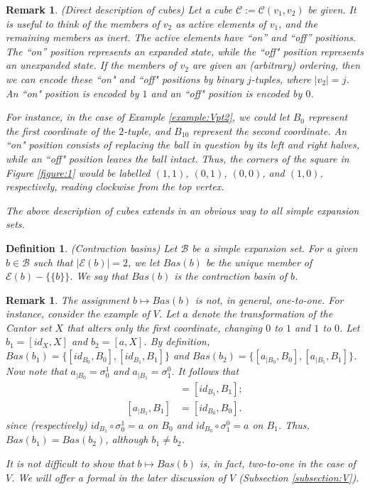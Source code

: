 \documentclass{amsart}
\newtheorem{Definition}[theorem]{Definition}
\newtheorem{Remark}[theorem]{Remark}
\newtheorem{standing assumption}[theorem]{Standing Assumption}
\newenvironment{definition}{\begin{Definition}\normalfont}{\end{Definition}}
\newenvironment{remark}{\begin{Remark}\normalfont}{\end{Remark}}
\begin{document}
\begin{remark} \label{remark:cubes}
(Direct description of cubes)
Let a cube $\mathcal{C} := \mathcal{C}(v_{1}, v_{2})$ be given. It is useful to think of the members of
$v_{2}$ as \emph{active} elements of $v_{1}$, and the remaining members as \emph{inert}. The active elements have ``on'' and ``off'' positions. The ``on'' position represents an expanded state, while the ``off" position represents an unexpanded state.
If the members of $v_{2}$ are given an (arbitrary) ordering, then we can encode these ``on" and ``off" positions by binary $j$-tuples, where $|v_{2}|=j$. An ``on" position is encoded by $1$ and an ``off" position is encoded by $0$. 

For instance, in the case of Example \ref{example:Vpt2}, we could let $B_{0}$ represent the first coordinate of the $2$-tuple, and $B_{10}$ represent the second coordinate. An ``on" position 
consists of replacing the ball in question by its left and right halves, while an ``off" position leaves the ball intact. Thus, the corners of the square in Figure \ref{figure:1} would be labelled  $(1,1)$, $(0,1)$, $(0,0)$, and $(1,0)$, respectively, reading clockwise from the top vertex. 

The above description of cubes extends in an obvious way to all simple expansion sets. 
\end{remark}

\begin{definition} \label{definition:basin} (Contraction basins)
Let $\mathcal{B}$ be a simple expansion set. For a given $b \in \mathcal{B}$ such that
$|\mathcal{E}(b)|=2$, we let $Bas(b)$ be the unique member of 
$\mathcal{E}(b) - \{ \{b \} \}$. We say that $Bas(b)$ is the \emph{contraction basin of $b$}.
\end{definition}

\begin{remark}
The assignment $b \mapsto Bas(b)$ is not, in general, one-to-one. For instance, consider the example of $V$. Let $a$ denote the transformation of the Cantor set $X$ that alters only the first coordinate, changing $0$ to $1$ and $1$ to $0$. Let $b_{1} = [id_{X},X]$ and
$b_{2} = [a,X]$. By definition, $Bas(b_{1}) = \{ [id_{B_{0}}, B_{0}], [id_{B_{1}}, B_{1}] \}$
and $Bas(b_{2}) = \{ [a_{\mid B_{0}}, B_{0}], [a_{\mid B_{1}},B_{1}] \}$. Now note that
$a_{\mid B_{0}} = \sigma_{0}^{1}$ and $a_{\mid B_{1}} = \sigma_{1}^{0}$. It follows 
that 
\begin{align*}
[a_{\mid B_{0}}, B_{0}] &= [id_{B_{1}}, B_{1}]; \\
[a_{\mid B_{1}}, B_{1}] &= [id_{B_{0}}, B_{0}].
\end{align*}
since (respectively) $id_{B_{1}} \circ \sigma_{0}^{1} = a$ on $B_{0}$ 
and $id_{B_{0}} \circ \sigma_{1}^{0} = a$ on $B_{1}$. Thus, $Bas(b_{1}) = Bas(b_{2})$, although $b_{1} \neq b_{2}$. 

It is not difficult to show that $b \mapsto Bas(b)$ is, in fact, two-to-one in the case of $V$. We will offer a formal in the later discussion of $V$ (Subsection \ref{subsection:V}).
\end{remark}
\end{document}
